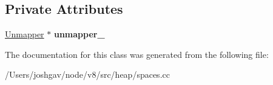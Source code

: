 \subsection*{Private Attributes}
\begin{DoxyCompactItemize}
\item 
\hyperlink{classv8_1_1internal_1_1_memory_allocator_1_1_unmapper}{Unmapper} $\ast$ {\bfseries unmapper\+\_\+}\hypertarget{classv8_1_1internal_1_1_memory_allocator_1_1_unmapper_1_1_unmap_free_memory_task_a1613f18aba85efcf0f6c92894a7a0805}{}\label{classv8_1_1internal_1_1_memory_allocator_1_1_unmapper_1_1_unmap_free_memory_task_a1613f18aba85efcf0f6c92894a7a0805}

\end{DoxyCompactItemize}


The documentation for this class was generated from the following file\+:\begin{DoxyCompactItemize}
\item 
/\+Users/joshgav/node/v8/src/heap/spaces.\+cc\end{DoxyCompactItemize}
